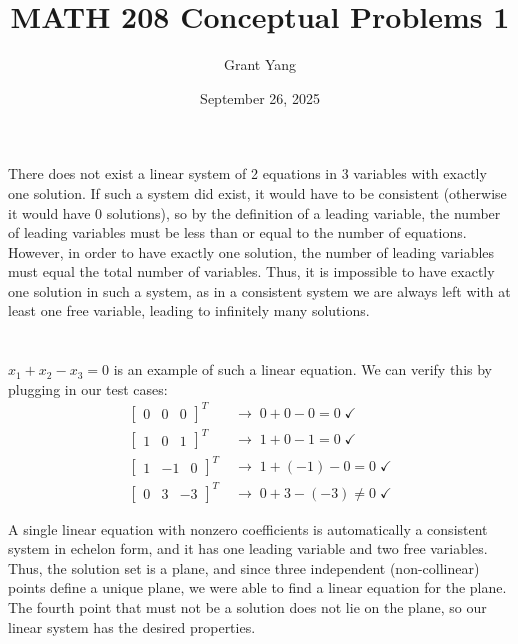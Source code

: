 \documentclass[12pt]{amsart}
\title{MATH 208 Conceptual Problems 1}
\author{Grant Yang}
\date{September 26, 2025}
\begin{document}
\maketitle
\section{}
There does not exist a linear system of 2 equations in 3 variables with exactly one solution. If such a system did exist, it would have to be consistent (otherwise it would have 0 solutions), so by the definition of a leading variable, the number of leading variables must be less than or equal to the number of equations. However, in order to have exactly one solution, the number of leading variables must equal the total number of variables. Thus, it is impossible to have exactly one solution in such a system, as in a consistent system we are always left with at least one free variable, leading to infinitely many solutions.

\section{}
$x_1+x_2-x_3=0$ is an example of such a linear equation. We can verify this by plugging in our test cases:
\begin{align*}
\begin{bmatrix}0 & 0 & 0 \end{bmatrix}^T&\;\longrightarrow\;0 + 0 - 0 = 0\;\checkmark \\
\begin{bmatrix}1 & 0 & 1 \end{bmatrix}^T&\;\longrightarrow\;1+0-1=0\;\checkmark \\
\begin{bmatrix}1 & -1 & 0 \end{bmatrix}^T&\;\longrightarrow\;1+(-1)-0=0\;\checkmark  \\
\begin{bmatrix}0 & 3 & -3 \end{bmatrix}^T &\;\longrightarrow\; 0+3-(-3) \ne 0\;\checkmark
\end{align*}

A single linear equation with nonzero coefficients is automatically a consistent system in echelon form, and it has one leading variable and two free variables. Thus, the solution set is a plane, and since three independent (non-collinear) points define a unique plane, we were able to find a linear equation for the plane. The fourth point that must not be a solution does not lie on the plane, so our linear system has the desired properties.
\end{document}
